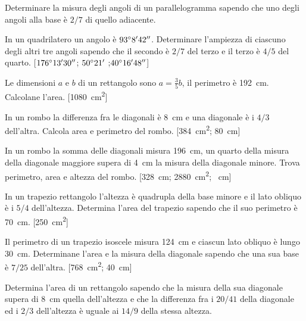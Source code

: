\begin{multicols}{2}
\begin{esercizio}
\label{ese:7.61}
Determinare la misura degli angoli di un parallelogramma sapendo che uno degli angoli alla base è $2/7$ di quello adiacente.
\end{esercizio}

\begin{esercizio}
\label{ese:7.62}
In un quadrilatero un angolo è $93{}^{\circ}8'42''$. Determinare l'ampiezza di ciascuno degli altri tre angoli sapendo che il secondo è $2/7$ del terzo e il terzo è $4/5$ del quarto. [$176{}^{\circ}13'30''$; $50{}^{\circ}21'$ ;$40{}^{\circ}16'48''$]
\end{esercizio}

\begin{esercizio}
\label{ese:7.63}
Le dimensioni $a$ e $b$ di un rettangolo sono $a=\frac{3}{5}b$, il perimetro è 192~cm. Calcolane l'area.
[1080~cm\textsuperscript{2}]
\end{esercizio}

\begin{esercizio}
\label{ese:7.64}
In un rombo la differenza fra le diagonali è 8~cm e una diagonale è i $4/3$ dell'altra. Calcola area e perimetro del rombo.
[384~cm\textsuperscript{2}; 80~cm]
\end{esercizio}

\begin{esercizio}
\label{ese:7.65}
In un rombo la somma delle diagonali misura 196~cm, un quarto della misura della diagonale maggiore supera di 4~cm la misura della diagonale minore. Trova perimetro, area e altezza del rombo.
[328~cm; 2880~cm\textsuperscript{2}; ~cm]
\end{esercizio}

\begin{esercizio}
\label{ese:7.66}
In un trapezio rettangolo l'altezza è quadrupla della base minore e il lato obliquo è i $5/4$ dell'altezza. Determina l'area del trapezio sapendo che il suo perimetro è 70~cm.
[250~cm\textsuperscript{2}]
\end{esercizio}

\begin{esercizio}
\label{ese:7.67}
Il perimetro di un trapezio isoscele misura 124~cm e ciascun lato obliquo è lungo 30~cm. Determinane l'area e la misura della diagonale sapendo che una sua base è $7/25$ dell'altra.
[768~cm\textsuperscript{2}; 40~cm]
\end{esercizio}

\begin{esercizio}
\label{ese:7.68}
Determina l'area di un rettangolo sapendo che la misura della sua diagonale supera di 8~cm quella dell'altezza e che la differenza fra i $20/41$ della diagonale ed i $2/3$ dell'altezza è uguale ai $14/9$ della stessa altezza.
\end{esercizio}


\end{multicols}
